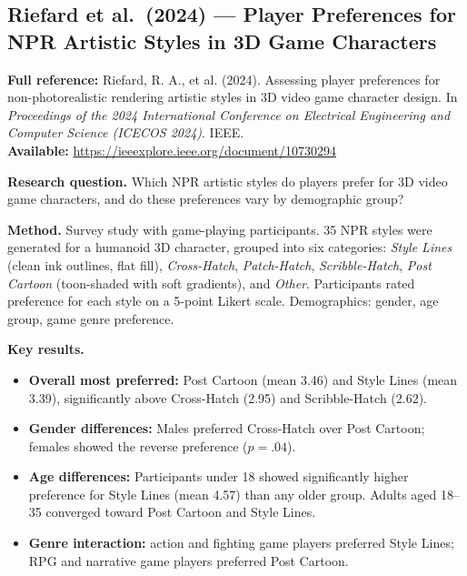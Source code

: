 \documentclass[11pt, a4paper]{article}
\begin{document}
\vspace{8pt}
\subsection{Riefard et al.\ (2024) --- Player Preferences for NPR Artistic Styles in 3D Game Characters}

\begin{refbox}
\textbf{Full reference:} Riefard, R. A., et al. (2024). Assessing player preferences for non-photorealistic rendering artistic styles in 3D video game character design. In \textit{Proceedings of the 2024 International Conference on Electrical Engineering and Computer Science (ICECOS 2024)}. IEEE.\\[4pt]
\textbf{Available:} \url{https://ieeexplore.ieee.org/document/10730294}
\end{refbox}

\textbf{Research question.} Which NPR artistic styles do players prefer for 3D video game characters, and do these preferences vary by demographic group?

\textbf{Method.} Survey study with game-playing participants. 35 NPR styles were generated for a humanoid 3D character, grouped into six categories: \textit{Style Lines} (clean ink outlines, flat fill), \textit{Cross-Hatch}, \textit{Patch-Hatch}, \textit{Scribble-Hatch}, \textit{Post Cartoon} (toon-shaded with soft gradients), and \textit{Other}. Participants rated preference for each style on a 5-point Likert scale. Demographics: gender, age group, game genre preference.

\textbf{Key results.}
\begin{itemize}[leftmargin=2em]
  \item \textbf{Overall most preferred:} Post Cartoon (mean 3.46) and Style Lines (mean 3.39), significantly above Cross-Hatch (2.95) and Scribble-Hatch (2.62).
  \item \textbf{Gender differences:} Males preferred Cross-Hatch over Post Cartoon; females showed the reverse preference ($p = .04$).
  \item \textbf{Age differences:} Participants under 18 showed significantly higher preference for Style Lines (mean 4.57) than any older group. Adults aged 18--35 converged toward Post Cartoon and Style Lines.
  \item \textbf{Genre interaction:} action and fighting game players preferred Style Lines; RPG and narrative game players preferred Post Cartoon.
\end{itemize}
\end{document}
